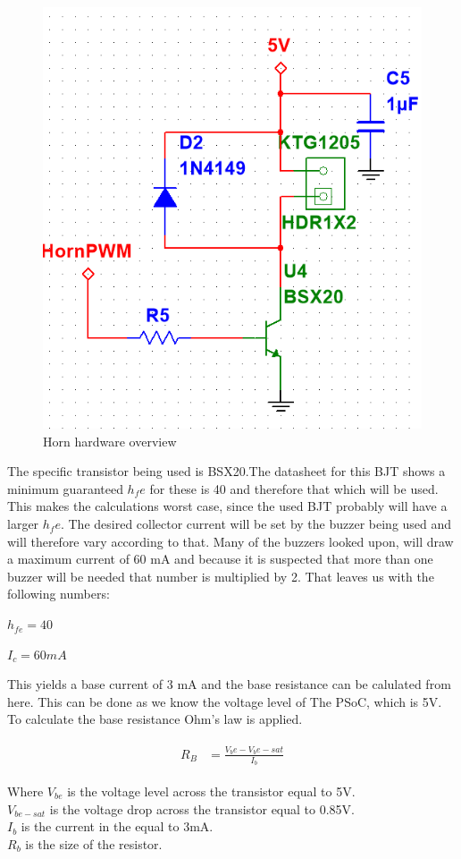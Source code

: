 \begin{figure}[H]
	\centering
	\includegraphics[width=0.7\linewidth]{Hardware/Pictures/Horn_hw}
	\caption{Horn hardware overview}
	\label{fig:Horn_control}
\end{figure}

The specific transistor being used is BSX20.The datasheet  for this BJT shows a minimum guaranteed $h_fe$ for these is 40 and therefore that which will be used. This makes the calculations worst case, since the used BJT probably will have a larger $h_fe$. The desired collector current will be set by the buzzer being used and will therefore vary according to that. Many of the buzzers looked upon, will draw a maximum current of 60 mA and because it is suspected that more than one buzzer will be needed that number is multiplied by 2. That leaves us with the following numbers:

$h_{fe} = 40 $ 

$I_c = 60 mA$

This yields a base current of 3 mA and the base resistance can be calulated from here. This can be done as we know the voltage level of The PSoC, which is 5V. \\
To calculate the base resistance Ohm's law is applied. 

\begin{align}
	\begin{split}
		R_B &= \frac{V_be - V_be-sat}{I_b}
	\end{split}
\end{align}

Where $V_{be}$ is the voltage level across the transistor equal to 5V. \\ 
$V_{be-sat}$ is the voltage drop across the transistor equal to 0.85V. \\ 
$I_b$ is the current in the equal to 3mA.  \\
$R_b$ is the size of the resistor. \\ 

